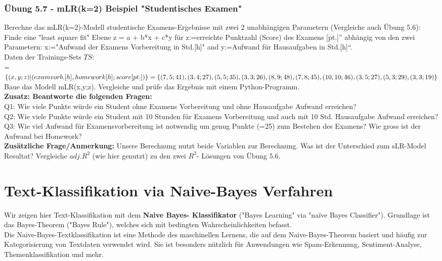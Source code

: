 \documentclass[12pt]{article}
\begin{document}
\subsubsection{Übung 5.7 - mLR(k=2) Beispiel "Studentisches Examen"}
%
Berechne das  mLR(k=2)-Modell studentische Examens-Ergebnisse mit zwei 2 unabhängigen Parametern (Vergleiche auch Übung 5.6):\\  
Finde eine "least square fit" Ebene  z = a + b*x + c*y für z:=erreichte Punktzahl (Score) des Examens [pt.]” abhängig von den zwei Parametern: x:="Aufwand der Examens Vorbereitung in Std.[h]" and y:=Aufwand für Hausaufgaben in Std.[h]“.\\[0.2cm]
Daten der Trainings-Sets $TS$: \\
= $ \lbrace (x, y; z) | (exam vorb.[h], homework[h]; score[pt.])\rbrace = \lbrace(7,5;41 ),(3,4;27), \\
(5,5;35), (3,3;26), (8,9;48), (7,8;45), (10,10;46), (3,5;27), (5,3;29), (3,3;19)\rbrace $ \\[0.2cm]
Baue das Modell mLR(x,y;z). Vergleiche und prüfe das Ergebnis mit einem Python-Programm.\\[0.2cm]
\textbf{Zusatz: Beantworte die folgenden Fragen:}\\ 
Q1: Wie viele Punkte würde ein Student ohne Examens Vorbereitung und ohne Hausaufgabe Aufwand erreichen? \\
Q2: Wie viele Punkte würde ein Student mit 10 Stunden für Examens Vorbereitung und auch mit 10 Std. Hausaufgabe Aufwand erreichen? \\ 
Q3: Wie viel Aufwand für Examensvorbereitung ist notwendig um genug Punkte (=25) zum Bestehen des Examens? Wie gross ist der Aufwand bei Homework?\\[0.2cm]
\textbf{Zusätzliche Frage/Anmerkung:} Unsere Berechnung nutzt beide Variablen zur Berechnung. Was ist der Unterschied zum sLR-Model Resultat? Vergleiche $adj.R^2$ (wie hier genutzt) zu den zwei $R^2$- Lösungen von Übung 5.6.\\

\newpage

\section{Text-Klassifikation via Naive-Bayes Verfahren \\}


Wir zeigen hier Text-Klassifikation mit dem \textbf{Naive Bayes- Klassifikator} ("Bayes Learning" via "naïve Bayes Classifier"). Grundlage ist das Bayes-Theorem ("Bayes Rule"), welches sich mit bedingten Wahrscheinlichkeiten befasst.\\
Die Naive-Bayes-Textklassifikation ist eine Methode des maschinellen Lernens, die auf dem Naive-Bayes-Theorem basiert und häufig zur Kategorisierung von Textdaten verwendet wird. Sie ist besonders nützlich für Anwendungen wie Spam-Erkennung, Sentiment-Analyse, Themenklassifikation und mehr.\\
\end{document}
